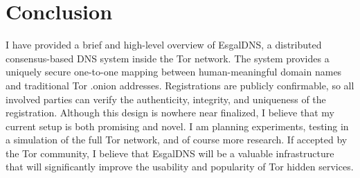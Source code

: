 \documentclass[journal]{IEEEtran}
\begin{document}
\section{Conclusion}

I have provided a brief and high-level overview of EsgalDNS, a distributed consensus-based DNS system inside the Tor network. The system provides a uniquely secure one-to-one mapping between human-meaningful domain names and traditional Tor .onion addresses. Registrations are publicly confirmable, so all involved parties can verify the authenticity, integrity, and uniqueness of the registration. Although this design is nowhere near finalized, I believe that my current setup is both promising and novel. I am planning experiments, testing in a simulation of the full Tor network, and of course more research. If accepted by the Tor community, I believe that EsgalDNS will be a valuable infrastructure that will significantly improve the usability and popularity of Tor hidden services.



\end{document}
